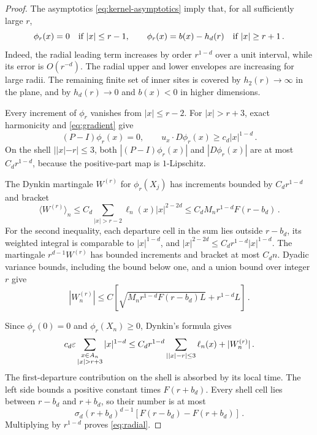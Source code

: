 \begin{proof}
The asymptotics \eqref{eq:kernel-asymptotics} imply that, for all
sufficiently large $r$,
\begin{equation}\label{eq:levelsets}
\phi_r(x)=0\quad\hbox{if }|x|\leq r-1 ,\qquad
\phi_r(x)=b(x)-h_d(r)\quad\hbox{if }|x|\geq r+1\, .
\end{equation}
Indeed, the radial leading term increases by order $r^{1-d}$
over a unit interval, while its error is $O(r^{-d})$.
The radial upper and lower envelopes are increasing for large radii.
The remaining finite set of inner sites is covered by $h_2(r)\to\infty$
in the plane, and by $h_d(r)\to0$ and $b(x)<0$ in higher dimensions.

Every increment of $\phi_r$ vanishes from $|x|\leq r-2$.
For $|x|>r+3$, exact harmonicity and \eqref{eq:gradient} give
\begin{equation}\label{eq:radial-drift}
(P-I)\phi_r(x)=0 ,\qquad
u_x\cdot D\phi_r(x)\geq c_d|x|^{1-d}\, .
\end{equation}
On the shell $||x|-r|\leq3$, both $|(P-I)\phi_r(x)|$ and
$|D\phi_r(x)|$ are at most $C_dr^{1-d}$, because the positive-part
map is $1$-Lipschitz.

The Dynkin martingale $W^{(r)}$ for $\phi_r(X_j)$ has increments
bounded by $C_dr^{1-d}$ and bracket
\begin{equation}\label{eq:radialbracket}
\langle W^{(r)}\rangle_n
\leq C_d\sum_{|x|>r-2}\ell_n(x)|x|^{2-2d}
\leq C_dM_nr^{1-d}F(r-b_d)\, .
\end{equation}
For the second inequality, each departure cell in the sum lies outside
$r-b_d$, its weighted integral is comparable to $|x|^{1-d}$, and
$|x|^{2-2d}\leq C_dr^{1-d}|x|^{1-d}$.
The martingale $r^{d-1}W^{(r)}$ has bounded increments and bracket
at most $C_dn$. Dyadic variance bounds, including the bound below one,
and a union bound over integer $r$ give
\begin{equation}\label{eq:radialmart}
|W_n^{(r)}|\leq C\left[
\sqrt{M_nr^{1-d}F(r-b_d)L}+r^{1-d}L\right]\, .
\end{equation}

Since $\phi_r(0)=0$ and $\phi_r(X_n)\geq0$, Dynkin's formula gives
\begin{equation}\label{eq:radial-source}
c_d\eps\sum_{\substack{x\in A_n\\|x|>r+3}}|x|^{1-d}
\leq C_dr^{1-d}\sum_{||x|-r|\leq3}\ell_n(x)+|W_n^{(r)}|\, .
\end{equation}
The first-departure contribution on the shell is absorbed by its local
time. The left side bounds a positive constant times $F(r+b_d)$.
Every shell cell lies between $r-b_d$ and $r+b_d$, so their number
is at most
\begin{equation}\label{eq:shell-count}
\sigma_d(r+b_d)^{d-1}[F(r-b_d)-F(r+b_d)]\, .
\end{equation}
Multiplying by $r^{1-d}$ proves \eqref{eq:radial}.
\end{proof}


